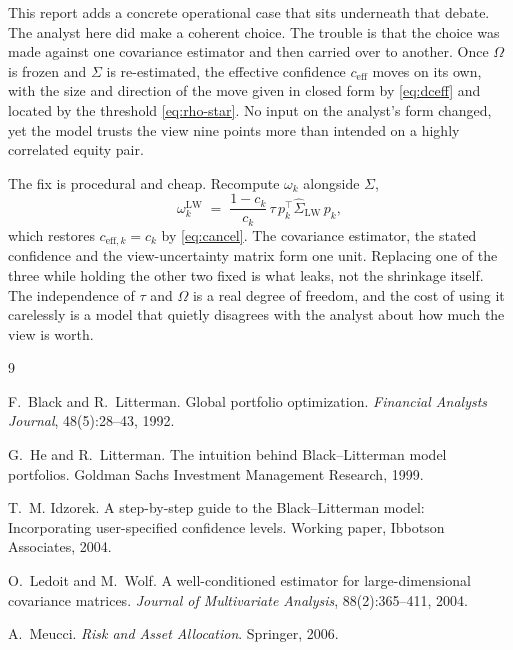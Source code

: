 \documentclass[a4paper,11pt]{article}
\theoremstyle{plain}
\theoremstyle{definition}
\newcommand{\LW}{\mathrm{LW}}
\newcommand{\eff}{\mathrm{eff}}
\begin{document}
This report adds a concrete operational case that sits underneath that debate. The
analyst here did make a coherent choice. The trouble is that the choice was made
against one covariance estimator and then carried over to another. Once $\Omega$
is frozen and $\Sigma$ is re-estimated, the effective confidence $c_{\eff}$ moves
on its own, with the size and direction of the move given in closed form by
\eqref{eq:dceff} and located by the threshold \eqref{eq:rho-star}. No input on the
analyst's form changed, yet the model trusts the view nine points more than
intended on a highly correlated equity pair.

The fix is procedural and cheap. Recompute $\omega_k$ alongside $\Sigma$,
\[
  \omega_k^\LW \;=\; \frac{1 - c_k}{c_k}\,\tau\,p_k^\top\hat\Sigma_{\LW}\,p_k ,
\]
which restores $c_{\eff,k} = c_k$ by \eqref{eq:cancel}. The covariance estimator,
the stated confidence and the view-uncertainty matrix form one unit. Replacing one
of the three while holding the other two fixed is what leaks, not the shrinkage
itself. The independence of $\tau$ and $\Omega$ is a real degree of freedom, and
the cost of using it carelessly is a model that quietly disagrees with the
analyst about how much the view is worth.


\begin{thebibliography}{9}

F.~Black and R.~Litterman.
\newblock Global portfolio optimization.
\newblock \emph{Financial Analysts Journal}, 48(5):28--43, 1992.

G.~He and R.~Litterman.
\newblock The intuition behind Black--Litterman model portfolios.
\newblock Goldman Sachs Investment Management Research, 1999.

T.~M. Idzorek.
\newblock A step-by-step guide to the Black--Litterman model: Incorporating
user-specified confidence levels.
\newblock Working paper, Ibbotson Associates, 2004.

O.~Ledoit and M.~Wolf.
\newblock A well-conditioned estimator for large-dimensional covariance
matrices.
\newblock \emph{Journal of Multivariate Analysis}, 88(2):365--411, 2004.

A.~Meucci.
\newblock \emph{Risk and Asset Allocation}.
\newblock Springer, 2006.

\end{thebibliography}
\end{document}

